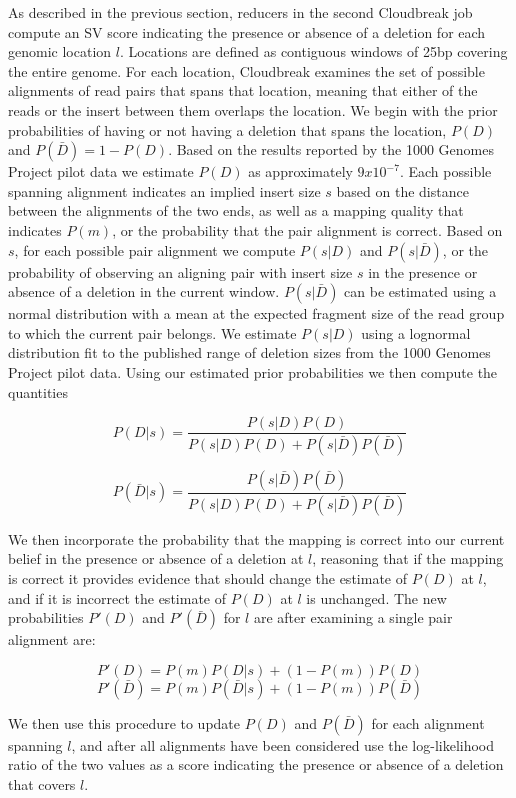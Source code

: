 \documentclass[12pt]{article}
\begin{document}
As described in the previous section, reducers in the second Cloudbreak job compute an SV score indicating the presence or absence of a deletion for each genomic location $l$. Locations are defined as contiguous windows of 25bp covering the entire genome. For each location, Cloudbreak examines the set of possible alignments of read pairs that spans that location, meaning that either of the reads or the insert between them overlaps the location. We begin with the prior probabilities of having or not having a deletion that spans the location, $P(D)$ and $P(\bar{D}) = 1 - P(D)$. Based on the results reported by the 1000 Genomes Project pilot data \cite{Mills:2011p1611} we estimate $P(D)$ as approximately $9x10^{-7}$. Each possible spanning alignment indicates an implied insert size $s$ based on the distance between the alignments of the two ends, as well as a mapping quality that indicates $P(m)$, or the probability that the pair alignment is correct. Based on $s$, for each possible pair alignment we compute $P(s|D)$ and $P(s|\bar{D})$, or the probability of observing an aligning pair with insert size $s$ in the presence or absence of a deletion in the current window. $P(s|{\bar{D}})$ can be estimated using a normal distribution with a mean at the expected fragment size of the read group to which the current pair belongs. We estimate $P(s|D)$ using a lognormal distribution fit to the published range of deletion sizes from the 1000 Genomes Project pilot data. Using our estimated prior probabilities we then compute the quantities

\[ 
P(D|s) = \frac{P(s|D)P(D)} {P(s|D)P(D) + P(s|\bar{D})P(\bar{D})}
\]

\[ 
P(\bar{D}|s) = \frac{P(s|\bar{D})P(\bar{D})}{P(s|D)P(D) + P(s|\bar{D})P(\bar{D})} 
\]

We then incorporate the probability that the mapping is correct into our current belief in the presence or absence of a deletion at $l$, reasoning that if the mapping is correct it provides evidence that should change the estimate of $P(D)$ at $l$, and if it is incorrect the estimate of $P(D)$ at $l$ is unchanged. The new probabilities $P'(D)$ and $P'(\bar{D})$ for $l$ are after examining a single pair alignment are:

\[ P'(D) = P(m)P(D|s) + (1 - P(m))P(D) \]
\[ P'(\bar{D}) = P(m)P(\bar{D}|s) + (1 - P(m))P(\bar{D}) \]

We then use this procedure to update $P(D)$ and $P(\bar{D})$ for each alignment spanning $l$, and after all alignments have been considered use the log-likelihood ratio of the two values as a score indicating the presence or absence of a deletion that covers $l$.
\end{document}
